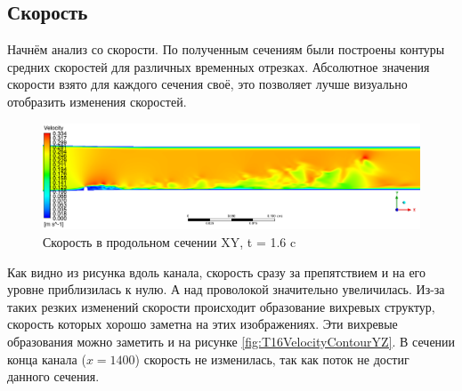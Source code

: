 \subsection{Скорость}
	Начнём анализ со скорости. По полученным сечениям были построены контуры средних скоростей для различных временных отрезках. Абсолютное значения скорости взято для каждого сечения своё, это позволяет лучше визуально отобразить изменения скоростей.
	\begin{figure}[H]
		\centering
		\includegraphics[width=1\linewidth]{../Assets/T16_Velocity_ContourXY}
		\caption{Скорость в продольном сечении XY, t = 1.6 c}
		\label{fig:t16velocitycontourxy}
	\end{figure}
	Как видно из рисунка вдоль канала, скорость сразу за препятствием и на его уровне приблизилась к нулю. А над проволокой значительно увеличилась. Из-за таких резких изменений скорости происходит образование вихревых структур, скорость которых хорошо заметна на этих изображениях. Эти вихревые образования можно заметить и на рисунке \ref{fig:T16VelocityContourYZ}. В сечении конца канала ($x = 1400$) скорость не изменилась, так как поток не достиг данного сечения.

